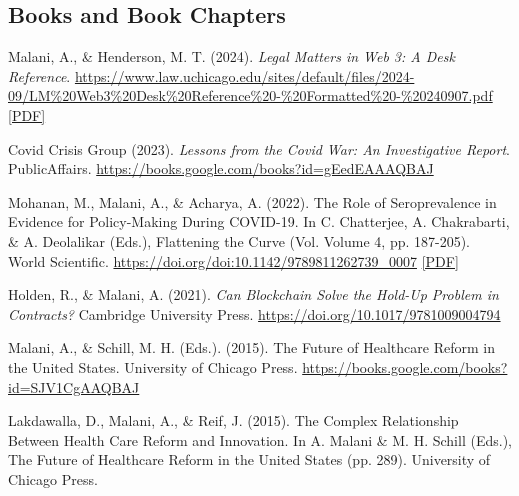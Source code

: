     \subsection*{Books and Book Chapters}

    \begin{tablist}

        \item[2024] \tab{}Malani, A., \& Henderson, M. T. (2024). \textit{Legal Matters in Web 3: A Desk Reference}. \href{https://www.law.uchicago.edu/sites/default/files/2024-09/LM%20Web3%20Desk%20Reference%20-%20Formatted%20-%20240907.pdf}{https://www.law.uchicago.edu/sites/default/files/2024-09/LM\%20Web3\%20Desk\%20Reference\%20-\%20Formatted\%20-\%20240907.pdf} \href{https://github.com/anup-malani/website_personal/blob/main/publications/2024_Malani_Web3DeskReference.pdf}{[PDF]}
    
        \item[2023] \tab{}Covid Crisis Group (2023). \textit{Lessons from the Covid War: An Investigative Report}. PublicAffairs. \href{https://books.google.com/books?id=gEedEAAAQBAJ}{https://books.google.com/books?id=gEedEAAAQBAJ} 

        \item[2023] \tab{}Mohanan, M., Malani, A., \& Acharya, A. (2022). The Role of Seroprevalence in Evidence for Policy-Making During COVID-19. In C. Chatterjee, A. Chakrabarti, \& A. Deolalikar (Eds.), Flattening the Curve (Vol. Volume 4, pp. 187-205). World Scientific. \href{https://doi.org/doi:10.1142/9789811262739_0007}{https://doi.org/doi:10.1142/9789811262739\_0007} \href{https://github.com/anup-malani/website_personal/blob/main/publications/2023_MohananMalani_FlatteningCurveBook.pdf}{[PDF]}

        \item[2021] \tab{}Holden, R., \& Malani, A. (2021). \textit{Can Blockchain Solve the Hold-Up Problem in Contracts?} Cambridge University Press. \href{https://doi.org/10.1017/9781009004794}{https://doi.org/10.1017/9781009004794}

        \item[2015] \tab{}Malani, A., \& Schill, M. H. (Eds.). (2015). The Future of Healthcare Reform in the United States. University of Chicago Press. \href{https://books.google.com/books?id=SJV1CgAAQBAJ}{https://books.google.com/books?id=SJV1CgAAQBAJ}  

        \item[2015] \tab{}Lakdawalla, D., Malani, A., \& Reif, J. (2015). The Complex Relationship Between Health Care Reform and Innovation. In A. Malani \& M. H. Schill (Eds.), The Future of Healthcare Reform in the United States (pp. 289). University of Chicago Press. 


\end{tablist}
